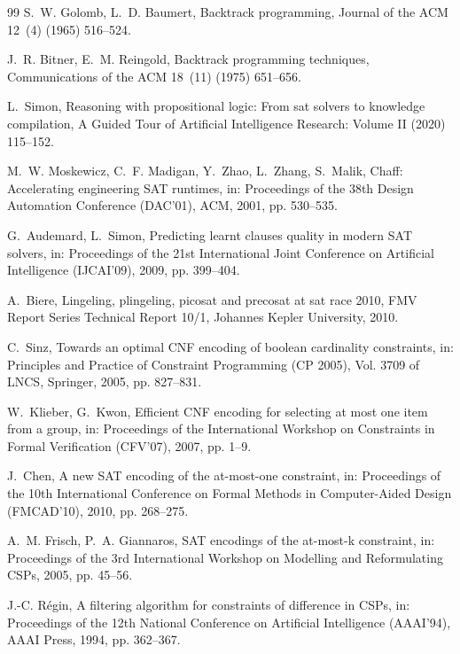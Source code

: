 \documentclass[a4paper,fleqn]{cas-sc}
\begin{document}
\begin{thebibliography}{99}
S.~W. Golomb, L.~D. Baumert, Backtrack programming, Journal of the ACM 12~(4) (1965) 516--524.

J.~R. Bitner, E.~M. Reingold, Backtrack programming techniques, Communications of the ACM 18~(11) (1975) 651--656.

L.~Simon, Reasoning with propositional logic: From sat solvers to knowledge compilation, A Guided Tour of Artificial Intelligence Research: Volume II (2020) 115--152.

M.~W. Moskewicz, C.~F. Madigan, Y.~Zhao, L.~Zhang, S.~Malik, Chaff: Accelerating engineering SAT runtimes, in: Proceedings of the 38th Design Automation Conference (DAC'01), ACM, 2001, pp. 530--535.

G.~Audemard, L.~Simon, Predicting learnt clauses quality in modern SAT solvers, in: Proceedings of the 21st International Joint Conference on Artificial Intelligence (IJCAI'09), 2009, pp. 399--404.

A.~Biere, Lingeling, plingeling, picosat and precosat at sat race 2010, FMV Report Series Technical Report 10/1, Johannes Kepler University, 2010.

C.~Sinz, Towards an optimal CNF encoding of boolean cardinality constraints, in: Principles and Practice of Constraint Programming (CP 2005), Vol. 3709 of LNCS, Springer, 2005, pp. 827--831.

W.~Klieber, G.~Kwon, Efficient CNF encoding for selecting at most one item from a group, in: Proceedings of the International Workshop on Constraints in Formal Verification (CFV'07), 2007, pp. 1--9.

J.~Chen, A new SAT encoding of the at-most-one constraint, in: Proceedings of the 10th International Conference on Formal Methods in Computer-Aided Design (FMCAD'10), 2010, pp. 268--275.

A.~M. Frisch, P.~A. Giannaros, SAT encodings of the at-most-k constraint, in: Proceedings of the 3rd International Workshop on Modelling and Reformulating CSPs, 2005, pp. 45--56.

J.-C. R{\'e}gin, A filtering algorithm for constraints of difference in CSPs, in: Proceedings of the 12th National Conference on Artificial Intelligence (AAAI'94), AAAI Press, 1994, pp. 362--367.

\end{thebibliography}
\end{document}
